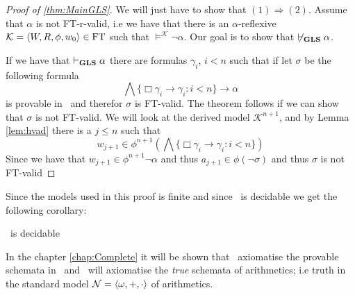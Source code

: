\documentclass[../main.tex]{subfiles}
\begin{document}
\begin{proof}[Proof of \ref{thm:MainGLS}]
	We will just have to show that $(1)\Rightarrow (2)$.
	Assume that $\alpha$ is not FT-r-valid, i.e we have that there is an
	$\alpha$-reflexive $\mathcal{K}=\langle W,R,\phi,w_0\rangle\in\text{FT}$ such
	that $\vDash^\mathcal{K}\neg\alpha$. Our goal is to show that
	$\not\vdash_{\text{\textbf{GLS}}}\alpha$.

	If we have that $\vdash_{\text{\textbf{GLS}}}\alpha$ there are formulas $\gamma_i$,
	$i<n$ such that if let $\sigma$ be the following formula
	\[\bigwedge\{\Box\gamma_i\rightarrow\gamma_i:i<n\}\rightarrow\alpha\]
	is provable in \GL\ and therefor $\sigma$ is FT-valid. The theorem
	follows if we can show that $\sigma$ is not FT-valid. We will look at
	the derived model $\mathcal{K}^{n+1}$, and by Lemma \ref{lem:hvad} there is a
	$j\leq n$ such that
	\[w_{j+1}\in\phi^{n+1}(\bigwedge\{\Box\gamma_i\rightarrow\gamma_i:i<n\})\]
	Since we have that $w_{j+1}\in\phi^{n+1}\neg\alpha$ and thus
	$a_{j+1}\in\phi(\neg\sigma)$ and thus $\sigma$ is not FT-valid
\end{proof}
Since the models used in this proof is finite and since \GL\ is decidable we get the following corollary:
\begin{cor}
	\GLS\ is decidable 
\end{cor}
In the chapter \ref{chap:Complete} it will be shown that \GL\ axiomatise the
provable schemata in \PRA\ and \GLS\ will axiomatise the \textit{true} schemata
of arithmetics; i.e truth in the standard model $\mathcal{N}=\langle
\omega,+,\cdot\rangle$ of arithmetics.
\end{document}
